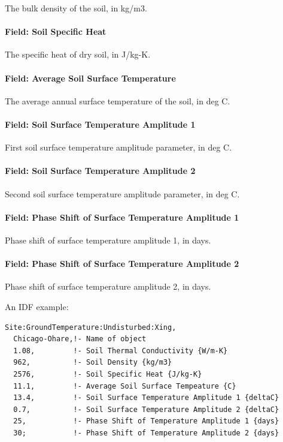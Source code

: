 The bulk density of the soil, in kg/m3.

\paragraph{Field: Soil Specific Heat}\label{field-soil-specific-heat-2}

The specific heat of dry soil, in J/kg-K.

\paragraph{Field: Average Soil Surface Temperature}\label{field-average-soil-surface-temperature-000}

The average annual surface temperature of the soil, in deg C.

\paragraph{Field: Soil Surface Temperature Amplitude 1}\label{field-soil-surface-temperature-amplitude-1}

First soil surface temperature amplitude parameter, in deg C.

\paragraph{Field: Soil Surface Temperature Amplitude 2}\label{field-soil-surface-temperature-amplitude-2}

Second soil surface temperature amplitude parameter, in deg C.

\paragraph{Field: Phase Shift of Surface Temperature Amplitude 1}\label{field-phase-shift-of-surface-temperature-amplitude-1}

Phase shift of surface temperature amplitude 1, in days.

\paragraph{Field: Phase Shift of Surface Temperature Amplitude 2}\label{field-phase-shift-of-surface-temperature-amplitude-2}

Phase shift of surface temperature amplitude 2, in days.

An IDF example:

\begin{lstlisting}
Site:GroundTemperature:Undisturbed:Xing,
  Chicago-Ohare,!- Name of object
  1.08,         !- Soil Thermal Conductivity {W/m-K}
  962,          !- Soil Density {kg/m3}
  2576,         !- Soil Specific Heat {J/kg-K}
  11.1,         !- Average Soil Surface Tempeature {C}
  13.4,         !- Soil Surface Temperature Amplitude 1 {deltaC}
  0.7,          !- Soil Surface Temperature Amplitude 2 {deltaC}
  25,           !- Phase Shift of Temperature Amplitude 1 {days}
  30;           !- Phase Shift of Temperature Amplitude 2 {days}
\end{lstlisting}

